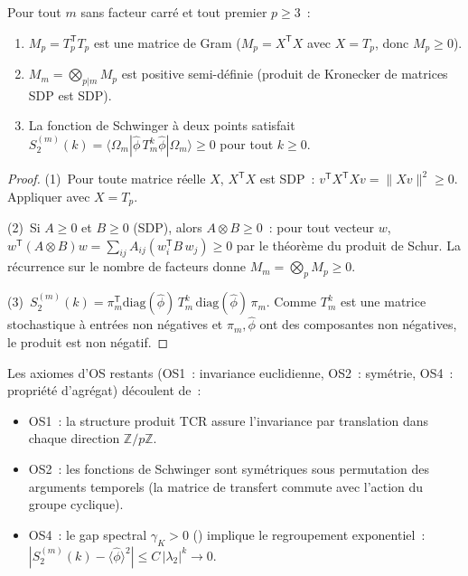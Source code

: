 \documentclass[12pt,a4paper]{article}
\begin{document}
\begin{theoreme}
\label{thm:app_OS3}
Pour tout $m$ sans facteur carré et tout premier $p \geq 3$~:
\begin{enumerate}[nosep]
\item $M_p = T_p^{\mathsf{T}} T_p$ est une matrice de Gram
  ($M_p = X^{\mathsf{T}} X$ avec $X = T_p$, donc $M_p \geq 0$).
\item $M_m = \bigotimes_{p | m} M_p$ est positive semi-définie
  (produit de Kronecker de matrices SDP est SDP).
\item La fonction de Schwinger à deux points satisfait
  $S_2^{(m)}(k) = \langle\Omega_m| \hat\phi\, T_m^k \hat\phi
  |\Omega_m\rangle \geq 0$ pour tout $k \geq 0$.
\end{enumerate}
\begin{proof}
(1)~Pour toute matrice réelle $X$, $X^{\mathsf{T}} X$ est SDP~:
$v^{\mathsf{T}} X^{\mathsf{T}} X v = \|Xv\|^2 \geq 0$. Appliquer
avec $X = T_p$.

(2)~Si $A \geq 0$ et $B \geq 0$ (SDP), alors $A \otimes B \geq 0$~:
pour tout vecteur $w$, $w^{\mathsf{T}} (A \otimes B) w =
\sum_{ij} A_{ij} (w_i^{\mathsf{T}} B\, w_j) \geq 0$ par le
théorème du produit de Schur. La récurrence sur le nombre de
facteurs donne $M_m = \bigotimes_p M_p \geq 0$.

(3)~$S_2^{(m)}(k) = \pi_m^{\mathsf{T}} \mathrm{diag}(\hat\phi)\,
T_m^k\, \mathrm{diag}(\hat\phi)\, \pi_m$. Comme $T_m^k$ est une
matrice stochastique à entrées non négatives et $\pi_m, \hat\phi$
ont des composantes non négatives, le produit est non négatif.
\end{proof}
\end{theoreme}

Les axiomes d'OS restants (OS1~: invariance euclidienne, OS2~:
symétrie, OS4~: propriété d'agrégat) découlent de~:
\begin{itemize}[nosep]
\item OS1~: la structure produit TCR assure l'invariance par
  translation dans chaque direction $\mathbb{Z}/p\mathbb{Z}$.
\item OS2~: les fonctions de Schwinger sont symétriques sous
  permutation des arguments temporels (la matrice de transfert
  commute avec l'action du groupe cyclique).
\item OS4~: le gap spectral $\gamma_K > 0$ (\cite{companion_M3})
  implique le regroupement exponentiel~:
  $|S_2^{(m)}(k) - \langle\hat\phi\rangle^2| \leq C\,|\lambda_2|^k
  \to 0$.
\end{itemize}
\end{document}

